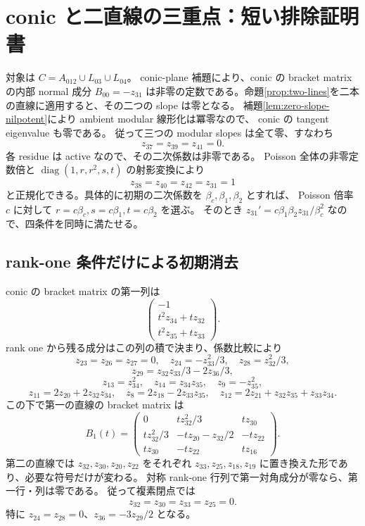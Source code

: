 \section{conic と二直線の三重点：短い排除証明書}

対象は $C=A_{012}\cup L_{03}\cup L_{04}$。
conic-plane 補題により、conic の bracket matrix の内部 normal 成分
$B_{00}=-z_{31}$ は非零の定数である。命題\ref{prop:two-lines}を二本の直線に適用すると、その二つの slope は零となる。
補題\ref{lem:zero-slope-nilpotent}により ambient modular 線形化は冪零なので、
conic の tangent eigenvalue も零である。
従って三つの modular slopes は全て零、すなわち
\[
z_{37}=z_{39}=z_{41}=0.
\]
各 residue は active なので、その二次係数は非零である。
Poisson 全体の非零定数倍と $\operatorname{diag}(1,r,r^2,s,t)$ の射影変換により
\[
z_{38}=z_{40}=z_{42}=z_{31}=1
\]
と正規化できる。具体的に初期の二次係数を $\beta_c,\beta_1,\beta_2$ とすれば、
Poisson 倍率 $c$ に対して $r=c\beta_c,s=c\beta_1,t=c\beta_2$ を選ぶ。
そのとき $z_{31}'=c\beta_1\beta_2 z_{31}/\beta_c^2$ なので、四条件を同時に満たせる。

\subsection{rank-one 条件だけによる初期消去}

conic の bracket matrix の第一列は
\[
\begin{pmatrix}-1\\t^2z_{34}+tz_{32}\\t^2z_{35}+tz_{33}\end{pmatrix}.
\]
rank one から残る成分はこの列の積で決まり、係数比較により
\[
z_{23}=z_{26}=z_{27}=0,\quad
z_{24}=-z_{33}^2/3,\quad z_{28}=z_{32}^2/3,
\]
\[
z_{29}=z_{32}z_{33}/3-2z_{36}/3,
\]
\[
z_{13}=z_{34}^2,\quad z_{14}=z_{34}z_{35},\quad z_9=-z_{35}^2,
\]
\[
z_{11}=2z_{20}+2z_{32}z_{34},\quad
z_8=2z_{18}-2z_{33}z_{35},\quad
z_{12}=2z_{21}+z_{32}z_{35}+z_{33}z_{34}.
\]
この下で第一の直線の bracket matrix は
\[
B_1(t)=
\begin{pmatrix}
0&tz_{32}^2/3&tz_{30}\\
tz_{32}^2/3&-tz_{20}-z_{32}/2&-tz_{22}\\
tz_{30}&-tz_{22}&tz_{16}
\end{pmatrix}.
\]
第二の直線では $z_{32},z_{30},z_{20},z_{22}$ をそれぞれ
$z_{33},z_{25},z_{18},z_{19}$ に置き換えた形であり、必要な符号だけが変わる。
対称 rank-one 行列で第一対角成分が零なら、第一行・列は零である。
従って複素閉点では
\[
z_{32}=z_{30}=z_{33}=z_{25}=0.
\]
特に $z_{24}=z_{28}=0$、$z_{36}=-3z_{29}/2$ となる。

